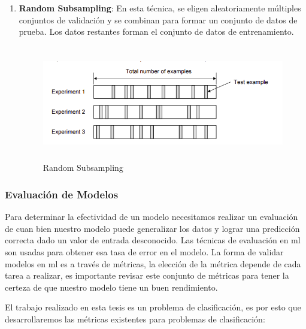 \begin{enumerate}
\item \textbf{Random Subsampling}: En esta técnica, se eligen aleatoriamente múltiples conjuntos de validación y se combinan para formar un conjunto de datos de prueba. Los datos restantes forman el conjunto de datos de entrenamiento.

\begin{figure}[H]
 \centering
  \includegraphics[height=5cm,keepaspectratio=true,clip=true]{imagenes/MarcoTeorico/cross-validation-random.png}
  \caption{Random Subsampling}
	\label{Fig: random-Subsampling}
\end{figure}

\end{enumerate}



\subsubsection{Evaluación de Modelos}\label{sub:evaluación-modelo}
Para determinar la efectividad de un modelo necesitamos realizar un evaluación de cuan bien nuestro modelo puede generalizar los datos y lograr una predicción correcta dado un valor de entrada desconocido. Las técnicas de evaluación en \ac{ml} son usadas para obtener esa tasa de error en el modelo. La forma de validar modelos en \ac{ml} es a través de métricas, la elección de la métrica depende de cada tarea a realizar, es importante revisar este conjunto de métricas para tener la certeza de que nuestro modelo tiene un buen rendimiento. 

El trabajo realizado en esta tesis es un problema de clasificación, es por esto que desarrollaremos las métricas existentes para problemas de clasificación:

